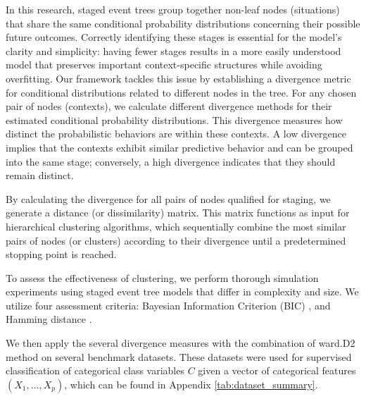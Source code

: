 \documentclass[preprint,12pt]{elsarticle}
\begin{document}
In this research, staged event trees group together non-leaf nodes (situations) that share the same conditional probability distributions concerning their possible future outcomes. Correctly identifying these stages is essential for the model's clarity and simplicity: having fewer stages results in a more easily understood model that preserves important context-specific structures while avoiding overfitting. Our framework tackles this issue by establishing a divergence metric for conditional distributions related to different nodes in the tree. For any chosen pair of nodes (contexts), we calculate different divergence methods for their estimated conditional probability distributions. This divergence measures how distinct the probabilistic behaviors are within these contexts. A low divergence implies that the contexts exhibit similar predictive behavior and can be grouped into the same stage; conversely, a high divergence indicates that they should remain distinct.

By calculating the divergence for all pairs of nodes qualified for staging, we generate a distance (or dissimilarity) matrix. This matrix functions as input for hierarchical clustering algorithms, which sequentially combine the most similar pairs of nodes (or clusters) according to their divergence until a predetermined stopping point is reached. 







To assess the effectiveness of clustering, we perform thorough simulation experiments using staged event tree models that differ in complexity and size. We utilize four assessment criteria: Bayesian Information Criterion (BIC) \cite{schwarz1978estimating}, and Hamming distance \cite{hamming1950error}.


We then apply the several divergence measures with the combination of ward.D2 method on several benchmark datasets. These datasets were used for supervised classification of categorical class variables $C$ given a vector of categorical features $(X_1,...,X_p)$, which can be found in Appendix \ref{tab:dataset_summary}.
\end{document}

